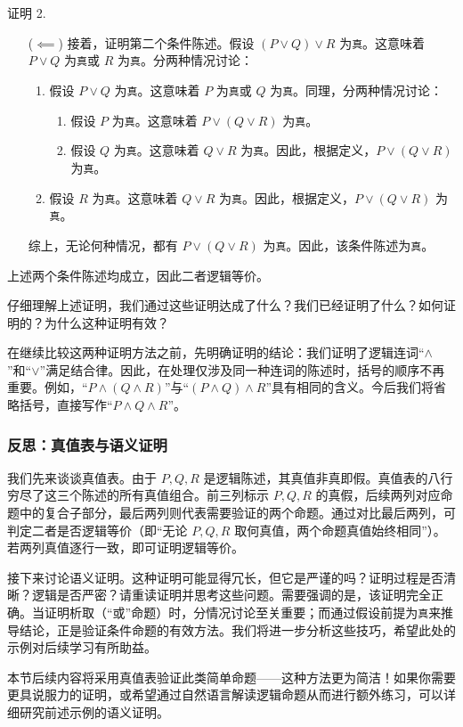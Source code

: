 \begin{proofs}{证明 2. }
\begin{itemize}
        \item[($\impliedby$)] 接着，证明第二个条件陈述。假设 $(P \lor Q) \lor R$ 为\verb|真|。这意味着 $P \lor Q$ 为\verb|真|或 $R$ 为\verb|真|。分两种情况讨论：
        \begin{enumerate}
            \item 假设 $P \lor Q$ 为\verb|真|。这意味着 $P$ 为\verb|真|或 $Q$ 为\verb|真|。同理，分两种情况讨论：
            \begin{enumerate}[label=(\alph*)]
                \item 假设 $P$ 为\verb|真|。这意味着 $P \lor (Q \lor R)$ 为\verb|真|。
                \item 假设 $Q$ 为\verb|真|。这意味着 $Q \lor R$ 为\verb|真|。因此，根据定义，$P \lor (Q \lor R)$ 为\verb|真|。
            \end{enumerate}
            \item 假设 $R$ 为\verb|真|。这意味着 $Q \lor R$ 为\verb|真|。因此，根据定义，$P \lor (Q \lor R)$ 为\verb|真|。
        \end{enumerate}   
        综上，无论何种情况，都有 $P \lor (Q \lor R)$ 为\verb|真|。因此，该条件陈述为\verb|真|。 
    \end{itemize}
    上述两个条件陈述均成立，因此二者逻辑等价。
\end{proofs}

仔细理解上述证明，我们通过这些证明达成了什么？我们已经证明了什么？如何证明的？为什么这种证明有效？

在继续比较这两种证明方法之前，先明确证明的结论：我们证明了逻辑连词``$\land$''和``$\lor$''满足结合律。因此，在处理仅涉及同一种连词的陈述时，括号的顺序不再重要。例如，``$P \land (Q \land R)$''与``$(P \land Q) \land R$''具有相同的含义。今后我们将省略括号，直接写作``$P \land Q \land R$''。

\subsubsection*{反思：真值表与语义证明}

我们先来谈谈真值表。由于 $P,Q,R$ 是逻辑陈述，其真值非真即假。真值表的八行穷尽了这三个陈述的所有真值组合。前三列标示 $P,Q,R$ 的真假，后续两列对应命题中的复合子部分，最后两列则代表需要验证的两个命题。通过对比最后两列，可判定二者是否逻辑等价（即``无论 $P,Q,R$ 取何真值，两个命题真值始终相同''）。若两列真值逐行一致，即可证明逻辑等价。

接下来讨论语义证明。这种证明可能显得冗长，但它是严谨的吗？证明过程是否清晰？逻辑是否严密？请重读证明并思考这些问题。需要强调的是，该证明完全正确。当证明析取（``或''命题）时，分情况讨论至关重要；而通过假设前提为\verb|真|来推导结论，正是验证条件命题的有效方法。我们将进一步分析这些技巧，希望此处的示例对后续学习有所助益。

本节后续内容将采用真值表验证此类简单命题——这种方法更为简洁！如果你需要更具说服力的证明，或希望通过自然语言解读逻辑命题从而进行额外练习，可以详细研究前述示例的语义证明。
